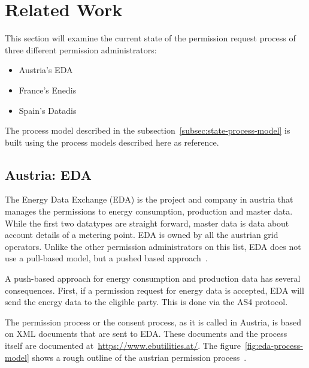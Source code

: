 \section{Related Work}\label{sec:related-work}
This section will examine the current state of the permission request process of three different permission administrators:
\begin{itemize}
    \item{}Austria's EDA
    \item{}France's Enedis
    \item{}Spain's Datadis
\end{itemize}

The process model described in the subsection\ \ref{subsec:state-process-model} is built using the process models described here as reference.

\subsection{Austria: EDA}\label{subsec:austria:-eda}
The Energy Data Exchange (EDA) is the project and company in austria that manages the permissions to energy consumption, production and master data.
While the first two datatypes are straight forward, master data is data about account details of a metering point.
EDA is owned by all the austrian grid operators.
Unlike the other permission administrators on this list, EDA does not use a pull-based model, but a pushed based approach~\cite{eda}.

A push-based approach for energy consumption and production data has several consequences.
First, if a permission request for energy data is accepted, EDA will send the energy data to the eligible party.
This is done via the AS4 protocol\cite{eda}.

The permission process or the consent process, as it is called in Austria, is based on XML documents that are sent to EDA.
These documents and the process itself are documented at\ \href{https://www.ebutilities.at/}{https://www.ebutilities.at/}.
The figure\ \ref{fig:eda-process-model} shows a rough outline of the austrian permission process~\cite{ebutilities}.

